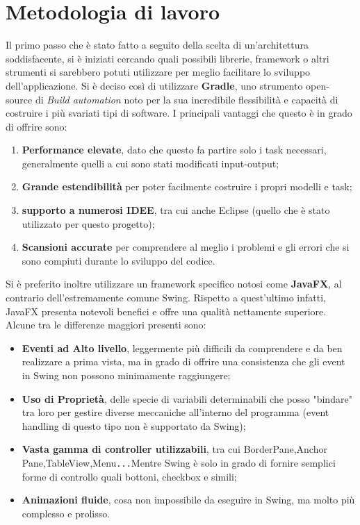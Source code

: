 \documentclass[a4paper,12pt]{report}
\begin{document}
\section{Metodologia di lavoro}
Il primo passo che è stato fatto a seguito della scelta di un'architettura soddisfacente, si è iniziati cercando quali possibili librerie, framework o altri strumenti si sarebbero potuti utilizzare per meglio facilitare lo sviluppo dell'applicazione. Si è deciso così di utilizzare \textbf{Gradle}, uno strumento open-source di \textit{Build automation} noto per la sua incredibile flessibilità e capacità di costruire i più svariati tipi di software. I principali vantaggi che questo è in grado di offrire sono:
\begin{enumerate}
    \item \textbf{Performance elevate}, dato che questo fa partire solo i task necessari, generalmente quelli a cui sono stati modificati input-output;
    \item \textbf{Grande estendibilità} per poter facilmente costruire i propri modelli e task;
    \item \textbf{supporto a numerosi IDEE}, tra cui anche Eclipse (quello che è stato utilizzato per questo progetto);
    \item \textbf{Scansioni accurate} per comprendere al meglio i problemi e gli errori che si sono compiuti durante lo sviluppo del codice.
\end{enumerate}
Si è preferito inoltre utilizzare un framework specifico notosi come \textbf{JavaFX}, al contrario dell'estremamente comune Swing. Rispetto a quest'ultimo infatti, JavaFX presenta notevoli benefici e offre una qualità nettamente superiore. Alcune tra le differenze maggiori presenti sono:
\begin{itemize}
    \item \textbf{Eventi ad Alto livello}, leggermente più difficili da comprendere e da ben realizzare a prima vista, ma in grado di offrire una consistenza che gli event in Swing non possono minimamente raggiungere;
    \item \textbf{Uso di Proprietà}, delle specie di variabili determinabili che posso "bindare" tra loro per gestire diverse meccaniche all'interno del programma (event handling di questo tipo non è supportato da Swing);
    \item \textbf{Vasta gamma di controller utilizzabili}, tra cui BorderPane,Anchor
    Pane,TableView,Menu\verb|...|Mentre Swing è solo in grado di fornire semplici forme di controllo quali bottoni, checkbox e simili;
    \item \textbf{Animazioni fluide}, cosa non impossibile da eseguire in Swing, ma molto più complesso e prolisso.
\end{itemize}
\end{document}
